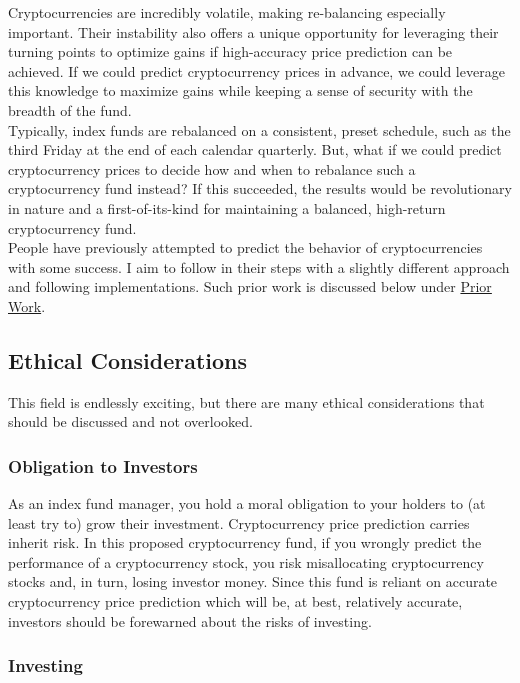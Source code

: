 \documentclass{article}
\begin{document}
Cryptocurrencies are incredibly volatile, making re-balancing especially important. Their instability also offers a unique opportunity for leveraging their turning points to optimize gains if high-accuracy price prediction can be achieved. If we could predict cryptocurrency prices in advance, we could leverage this knowledge to maximize gains while keeping a sense of security with the breadth of the fund. \\

Typically, index funds are rebalanced on a consistent, preset schedule, such as the third Friday at the end of each calendar quarterly. But, what if we could predict cryptocurrency prices to decide how and when to rebalance such a cryptocurrency fund instead? If this succeeded, the results would be revolutionary in nature and a first-of-its-kind for maintaining a balanced, high-return cryptocurrency fund. \\

People have previously attempted to predict the behavior of cryptocurrencies with some success. I aim to follow in their steps with a slightly different approach and following implementations. Such prior work is discussed below under \hyperref[sec:priorwork]{Prior Work}.

\subsection{Ethical Considerations}
\label{sec:ethical}

This field is endlessly exciting, but there are many ethical considerations that should be discussed and not overlooked.

\subsubsection{Obligation to Investors}
\label{sec:obligations}

As an index fund manager, you hold a moral obligation to your holders to (at least try to) grow their investment. Cryptocurrency price prediction carries inherit risk. In this proposed cryptocurrency fund, if you wrongly predict the performance of a cryptocurrency stock, you risk misallocating cryptocurrency stocks and, in turn, losing investor money. Since this fund is reliant on accurate cryptocurrency price prediction which will be, at best, relatively accurate, investors should be forewarned about the risks of investing.

\subsubsection{Investing}
\label{sec:investing}
\end{document}

